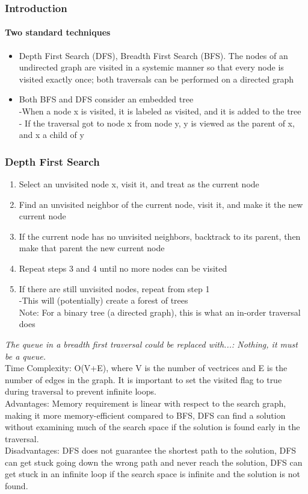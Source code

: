 \documentclass[10pt]{article}
\begin{document}
\subsubsection{Introduction}
\paragraph{Two standard techniques}
\begin{itemize}
    \item Depth First Search (DFS), Breadth First Search (BFS). The nodes of an undirected graph are visited in a systemic  manner so that every node is visited exactly once; both traversals can be performed on a directed graph
    \item  Both BFS and DFS consider an embedded tree\\
          -When a node x is visited, it is labeled as visited, and it is added to the tree\\
          - If the traversal got to node x from node y, y is viewed as the parent of x, and x a child of y
\end{itemize}

\subsubsection{Depth First Search}
\begin{enumerate}
    \item Select an unvisited node x, visit it, and treat as the current node
    \item Find an unvisited neighbor of the current node, visit it, and make it the new current node
    \item If the current node has no unvisited neighbors, backtrack to its parent, then make that parent the new current node
    \item Repeat steps 3 and 4 until no more nodes can be visited
    \item If there are still unvisited nodes, repeat from step 1
          \\ -This will (potentially) create a forest of trees
          \\ Note: For a binary tree (a directed graph), this is what an in-order traversal does
\end{enumerate}
\textit{The queue in a breadth first traversal could be replaced with...: Nothing, it must be a queue.}\\
Time Complexity: O(V+E), where V is the number of vectrices and E is the number of edges in the graph. It is important to set the visited flag to true during traversal to prevent infinite loops.\\
Advantages: Memory requirement is linear with respect to the search graph, making it more memory-efficient compared to BFS, DFS can find a solution without examining much of the search space if the solution is found early in the traversal.\\
Disadvantages: DFS does not guarantee the shortest path to the solution, DFS can get stuck going down the wrong path and never reach the solution, DFS can get stuck in an infinite loop if the search space is infinite and the solution is not found.
\end{document}

